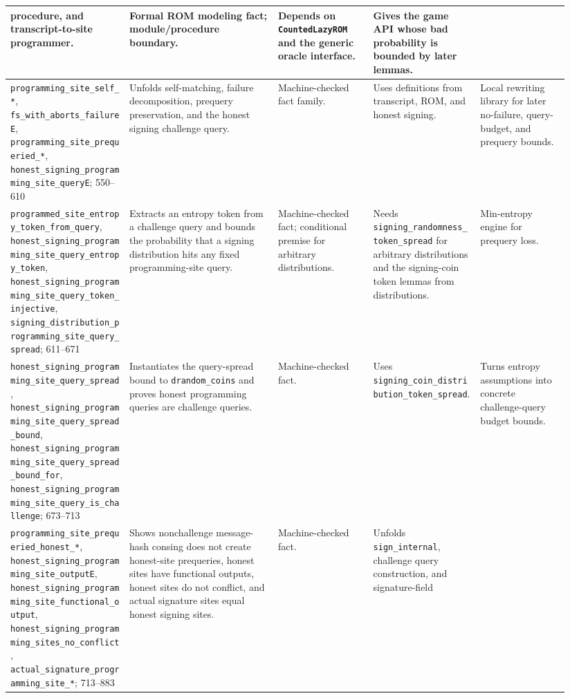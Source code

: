 \documentclass[11pt]{report}
\DeclareRobustCommand{\ec}[1]{\ifmmode\text{\nolinkurl{#1}}\else\nolinkurl{#1}\fi}
\theoremstyle{definition}
\theoremstyle{plain}
\begin{document}
\begin{longtable}{p{0.20\linewidth}p{0.25\linewidth}p{0.16\linewidth}p{0.18\linewidth}p{0.15\linewidth}}
procedure, and transcript-to-site programmer. &
Formal ROM modeling fact; module/procedure boundary. &
Depends on \ec{CountedLazyROM} and the generic oracle interface. &
Gives the game API whose bad probability is bounded by later lemmas. \\
\midrule
\ec{programming\_site\_self\_*},
\ec{fs\_with\_aborts\_failureE},
\ec{programming\_site\_prequeried\_*},
\ec{honest\_signing\_programming\_site\_queryE}; 550--610 &
Unfolds self-matching, failure decomposition, prequery preservation, and the
honest signing challenge query. &
Machine-checked fact family. &
Uses definitions from transcript, ROM, and honest signing. &
Local rewriting library for later no-failure, query-budget, and prequery
bounds. \\
\midrule
\ec{programmed\_site\_entropy\_token\_from\_query},
\ec{honest\_signing\_programming\_site\_query\_entropy\_token},
\ec{honest\_signing\_programming\_site\_query\_token\_injective},
\ec{signing\_distribution\_programming\_site\_query\_spread}; 611--671 &
Extracts an entropy token from a challenge query and bounds the probability
that a signing distribution hits any fixed programming-site query. &
Machine-checked fact; conditional premise for arbitrary distributions. &
Needs \ec{signing\_randomness\_token\_spread} for arbitrary distributions and
the signing-coin token lemmas from distributions. &
Min-entropy engine for prequery loss. \\
\midrule
\ec{honest\_signing\_programming\_site\_query\_spread},
\ec{honest\_signing\_programming\_site\_query\_spread\_bound},
\ec{honest\_signing\_programming\_site\_query\_spread\_bound\_for},
\ec{honest\_signing\_programming\_site\_query\_is\_challenge}; 673--713 &
Instantiates the query-spread bound to \ec{drandom\_coins} and proves honest
programming queries are challenge queries. &
Machine-checked fact. &
Uses \ec{signing\_coin\_distribution\_token\_spread}. &
Turns entropy assumptions into concrete challenge-query budget bounds. \\
\midrule
\ec{programming\_site\_prequeried\_honest\_*},
\ec{honest\_signing\_programming\_site\_outputE},
\ec{honest\_signing\_programming\_site\_functional\_output},
\ec{honest\_signing\_programming\_sites\_no\_conflict},
\ec{actual\_signature\_programming\_site\_*}; 713--883 &
Shows nonchallenge message-hash consing does not create honest-site prequeries,
honest sites have functional outputs, honest sites do not conflict, and actual
signature sites equal honest signing sites. &
Machine-checked fact. &
Unfolds \ec{sign\_internal}, challenge query construction, and signature-field

\end{longtable}
\end{document}
